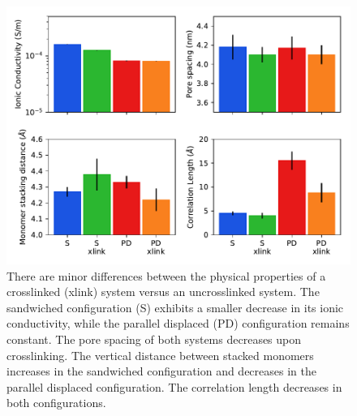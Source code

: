 \documentclass[journal=jpcbfk,manuscript=article]{achemso}
\begin{document}
  \begin{figure}[!htb]
  \centering
  \includegraphics[width=\textwidth]{xlink_charts.pdf}
  \caption{There are minor differences between the physical properties of a
  crosslinked (xlink) system versus an uncrosslinked system. The sandwiched configuration (S)
  exhibits a smaller decrease in its ionic conductivity, while the parallel displaced (PD)
  configuration remains constant. The pore spacing of both systems decreases upon crosslinking.
  The vertical distance between stacked monomers increases in the sandwiched configuration
  and decreases in the parallel displaced configuration. The correlation length decreases
  in both configurations.}\label{fig:xlink}
  \end{figure}
\end{document}
